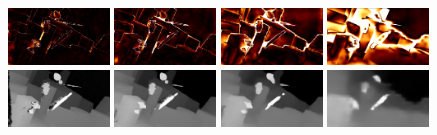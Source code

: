 \documentclass[runningheads]{llncs}
\begin{document}
\begin{figure}[t]
\begin{center}
        \\
        \includegraphics[width=0.24\textwidth,clip]{figures/pred_comb_0_err.png}
        \includegraphics[width=0.24\textwidth,clip]{figures/pred_comb_1_err.png}
        \includegraphics[width=0.24\textwidth,clip]{figures/pred_comb_2_err.png}
        \includegraphics[width=0.24\textwidth,clip]{figures/pred_comb_3_err.png}\\
        \includegraphics[width=0.24\textwidth,clip]{figures/pred_0.png}
        \includegraphics[width=0.24\textwidth,clip]{figures/pred_1.png}
        \includegraphics[width=0.24\textwidth,clip]{figures/pred_2.png}
        \includegraphics[width=0.24\textwidth,clip]{figures/pred_3.png}
        \\

\end{center}
\end{figure}
\end{document}
